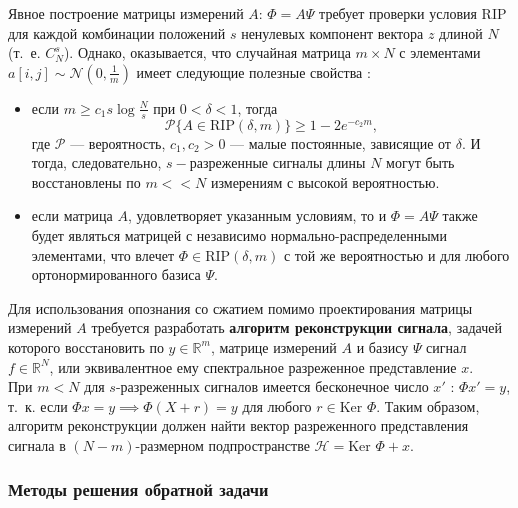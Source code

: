 \documentclass[14pt]{matmex-diploma-custom}
\begin{document}
Явное построение матрицы измерений $A$: $\Phi = A\Psi$ требует проверки условия RIP для каждой комбинации положений $s$ ненулевых компонент вектора $z$ длиной $N$ (т.~е. $C_N^s$). Однако, оказывается, что случайная матрица $m \times N$ с элементами $a[i, j] \sim \mathcal{N}(0, \frac{1}{m})$ имеет следующие полезные свойства \cite{candes2006robust}:
\begin{itemize}
\item если $m \geq c_1 s \log{\frac{N}{s}}$ при $0 < \delta < 1$, тогда \\
$$\mathcal{P}\{A \in \text{RIP}(\delta, m)\} \geq 1 - 2e^{-c_2 m},$$
где $\mathcal{P}$ --- вероятность, $c_1,c_2 > 0$  --- малые постоянные, зависящие от $\delta$. И тогда, следовательно, $s-$разреженные сигналы длины $N$ могут быть восстановлены по $m << N$ измерениям с высокой вероятностью.
\item если матрица $A$, удовлетворяет указанным условиям, то и $\Phi = A\Psi$ также будет являться матрицей с независимо нор\-маль\-но-рас\-пре\-де\-лен\-ными элементами, что влечет $\Phi \in \text{RIP}(\delta ,m)$ с той же вероятностью и для любого ортонормированного базиса $\Psi$.
\end{itemize}

Для использования опознания со сжатием помимо проектирования матрицы измерений $A$ требуется разработать \textbf{алгоритм реконструкции сигнала}, задачей которого восстановить по $y \in \mathbb{R}^m$, матрице измерений $A$ и базису $\Psi$ сигнал $f \in \mathbb{R}^N$, или эквивалентное ему спектральное разреженное представление $x$.\\

При $m < N$ для $s$-разреженных сигналов имеется бесконечное число $x'$ : $\Phi x' = y$, т.~к. если $\Phi x = y \implies \Phi(X+r) = y$ для любого $r \in \text{Ker }\Phi$. Таким образом, алгоритм реконструкции должен найти вектор разреженного представления сигнала в $(N - m)$-размерном подпространстве $\mathcal{H}=\text{Ker }\Phi + x$.\\

\subsubsection*{Методы решения обратной задачи}
\end{document}

